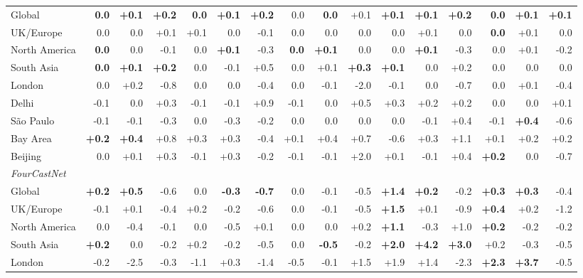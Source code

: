 \begin{table}[tbp]
\begin{tabular}{lrrrrrrrrrrrrrrr}
Global & \textbf{0.0} & \textbf{+0.1} & \textbf{+0.2} & \textbf{0.0} & \textbf{+0.1} & \textbf{+0.2} & 0.0 & \textbf{0.0} & +0.1 & \textbf{+0.1} & \textbf{+0.1} & \textbf{+0.2} & \textbf{0.0} & \textbf{+0.1} & \textbf{+0.1} \\
UK/Europe & 0.0 & 0.0 & +0.1 & +0.1 & 0.0 & -0.1 & 0.0 & 0.0 & 0.0 & 0.0 & +0.1 & 0.0 & \textbf{0.0} & +0.1 & 0.0 \\
North America & \textbf{0.0} & 0.0 & -0.1 & 0.0 & \textbf{+0.1} & -0.3 & \textbf{0.0} & \textbf{+0.1} & 0.0 & 0.0 & \textbf{+0.1} & -0.3 & 0.0 & +0.1 & -0.2 \\
South Asia & \textbf{0.0} & \textbf{+0.1} & \textbf{+0.2} & 0.0 & -0.1 & +0.5 & 0.0 & +0.1 & \textbf{+0.3} & \textbf{+0.1} & 0.0 & +0.2 & 0.0 & 0.0 & 0.0 \\
London & 0.0 & +0.2 & -0.8 & 0.0 & 0.0 & -0.4 & 0.0 & -0.1 & -2.0 & -0.1 & 0.0 & -0.7 & 0.0 & +0.1 & -0.4 \\
Delhi & -0.1 & 0.0 & +0.3 & -0.1 & -0.1 & +0.9 & -0.1 & 0.0 & +0.5 & +0.3 & +0.2 & +0.2 & 0.0 & 0.0 & +0.1 \\
São Paulo & -0.1 & -0.1 & -0.3 & 0.0 & -0.3 & -0.2 & 0.0 & 0.0 & 0.0 & 0.0 & -0.1 & +0.4 & -0.1 & \textbf{+0.4} & -0.6 \\
Bay Area & \textbf{+0.2} & \textbf{+0.4} & +0.8 & +0.3 & +0.3 & -0.4 & +0.1 & +0.4 & +0.7 & -0.6 & +0.3 & +1.1 & +0.1 & +0.2 & +0.2 \\
Beijing & 0.0 & +0.1 & +0.3 & -0.1 & +0.3 & -0.2 & -0.1 & -0.1 & +2.0 & +0.1 & -0.1 & +0.4 & \textbf{+0.2} & 0.0 & -0.7 \\
\midrule
\multicolumn{16}{l}{\textit{FourCastNet}} \\
Global & \textbf{+0.2} & \textbf{+0.5} & -0.6 & 0.0 & \textbf{-0.3} & \textbf{-0.7} & 0.0 & -0.1 & -0.5 & \textbf{+1.4} & \textbf{+0.2} & -0.2 & \textbf{+0.3} & \textbf{+0.3} & -0.4 \\
UK/Europe & -0.1 & +0.1 & -0.4 & +0.2 & -0.2 & -0.6 & 0.0 & -0.1 & -0.5 & \textbf{+1.5} & +0.1 & -0.9 & \textbf{+0.4} & +0.2 & -1.2 \\
North America & 0.0 & -0.4 & -0.1 & 0.0 & -0.5 & +0.1 & 0.0 & 0.0 & +0.2 & \textbf{+1.1} & -0.3 & +1.0 & \textbf{+0.2} & -0.2 & -0.2 \\
South Asia & \textbf{+0.2} & 0.0 & -0.2 & +0.2 & -0.2 & -0.5 & 0.0 & \textbf{-0.5} & -0.2 & \textbf{+2.0} & \textbf{+4.2} & \textbf{+3.0} & +0.2 & -0.3 & -0.5 \\
London & -0.2 & -2.5 & -0.3 & -1.1 & +0.3 & -1.4 & -0.5 & -0.1 & +1.5 & +1.9 & +1.4 & -2.3 & \textbf{+2.3} & \textbf{+3.7} & -0.5 \\

\end{tabular}
\end{table}
